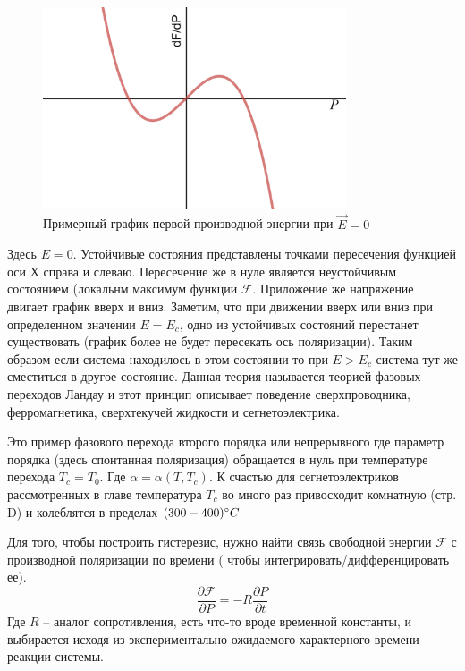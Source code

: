 \documentclass[a4paper,12pt]{article} %
\begin{document}
  
     \begin{figure}[H]
   \centering
  \includegraphics[width=0.8\textwidth]{graph_dgibs.png}
  \caption{Примерный график первой производной энергии при $\vec{E} = 0 $}
  \label{pic:diff}
  \end{figure}
  
   Здесь $E=0 $. Устойчивые состояния представлены точками пересечения функцией оси Х справа и слеваю. Пересечение же в нуле является неустойчивым состоянием (локальнм максимум функции $ \mathcal{F}  $. Приложение же напряжение двигает график вверх и вниз. Заметим, что при движении вверх или вниз при определенном значении $E=E_c $, одно из устойчивых состояний перестанет существовать (график более не будет пересекать ось поляризации). Таким образом если система находилось в этом состоянии то при $E>E_c$ система тут же сместиться в другое состояние. Данная теория называется теорией фазовых переходов Ландау и этот  принцип описывает поведение сверхпроводника, ферромагнетика, сверхтекучей жидкости и сегнетоэлектрика.
   
   
   
   
Это пример фазового перехода второго порядка или непрерывного
где параметр порядка (здесь спонтанная поляризация) обращается в нуль
при температуре перехода $T_c = T_0$. Где $ \alpha = \alpha(T,T_c) $. К счастью для сегнетоэлектриков рассмотренных в главе температура $T_c$ во много раз привосходит комнатную \cite{Segneto_MIPT-I}(стр. D) и колеблятся в пределах $ (300-400) \degree C  $


Для того, чтобы построить гистерезис, нужно найти связь свободной энергии $\mathcal{F} $ с производной поляризации по времени ( чтобы интегрировать/дифференцировать ее).
	 \begin{equation}\label{Rfermi}
		 \frac{\partial  \mathcal{F} }{\partial P} = - R  \frac{\partial  P }{\partial t}  
 	 \end{equation}
 	 Где $ R $ -- аналог сопротивления, есть что-то вроде временной константы, и  выбирается исходя из экспериментально ожидаемого характерного  времени реакции системы.
\end{document}
